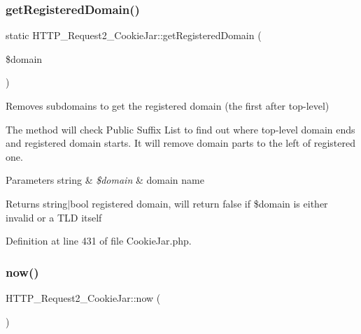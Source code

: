 \mbox{\label{classHTTP__Request2__CookieJar_a66c53f8393c3562e58491105165e77a9}} 
\subsubsection{\texorpdfstring{get\+Registered\+Domain()}{getRegisteredDomain()}}
{\footnotesize\ttfamily static H\+T\+T\+P\+\_\+\+Request2\+\_\+\+Cookie\+Jar\+::get\+Registered\+Domain (\begin{DoxyParamCaption}\item[{}]{\$domain }\end{DoxyParamCaption})\hspace{0.3cm}{\ttfamily [static]}}

Removes subdomains to get the registered domain (the first after top-\/level)

The method will check Public Suffix List to find out where top-\/level domain ends and registered domain starts. It will remove domain parts to the left of registered one.


\begin{DoxyParams}[1]{Parameters}
string & {\em \$domain} & domain name\\
\hline
\end{DoxyParams}
\begin{DoxyReturn}{Returns}
string$\vert$bool registered domain, will return false if \$domain is either invalid or a T\+LD itself 
\end{DoxyReturn}


Definition at line 431 of file Cookie\+Jar.\+php.

\mbox{\label{classHTTP__Request2__CookieJar_af7f3ec95c4a5b2594004b455c82081d6}} 
\subsubsection{\texorpdfstring{now()}{now()}}
{\footnotesize\ttfamily H\+T\+T\+P\+\_\+\+Request2\+\_\+\+Cookie\+Jar\+::now (\begin{DoxyParamCaption}{ }\end{DoxyParamCaption})\hspace{0.3cm}{\ttfamily [protected]}}

